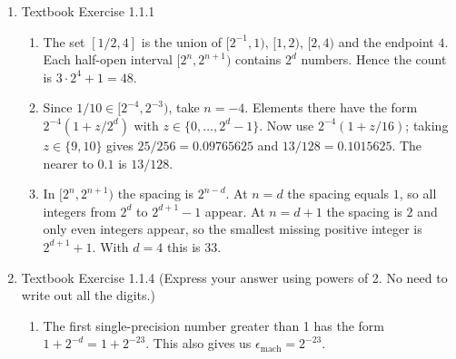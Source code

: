 \documentclass[reqno]{exam}
\begin{document}
\begin{enumerate}
\begin{solution}
\begin{enumerate}
  \item Computing $(a + b) - c$:
  \begin{align*}
    a &= 823.4 = 8.234 \times 10^{2} \quad \text{truncated:} \quad 8.234 \times 10^{2} \\
    b &= 723.45234 = 7.2345234 \times 10^{2} \quad \text{truncated:} \quad 7.234 \times 10^{2} \\
    a + b &= 8.234 \times 10^{2} + 7.234 \times 10^{2} = 1546.8 = 1.5468 \times 10^3 \\
    \text{truncated:} & \quad 1.546 \times 10^3 \\
    (a + b) - c &= 1.546 \times 10^{3} - 7.234 \times 10^{2} = 822.6 = 8.226 \times 10^{2} \\
    \text{truncated:} & \quad \boxed{8.226 \times 10^{2}}
  \end{align*}

\end{enumerate}
\end{solution}


\item Textbook Exercise 1.1.1

\begin{solution}
  \begin{enumerate}
    \item The set $[1/2,4]$ is the union of $[2^{-1},1)$, $[1,2)$, $[2,4)$ and the endpoint $4$. Each half-open interval $[2^n,2^{n+1})$ contains $2^d$ numbers. Hence the count is $3\cdot 2^4 + 1 = 48$.
    \item Since $1/10 \in [2^{-4},2^{-3})$, take $n=-4$. Elements there have the form $2^{-4}(1+z/2^d)$ with $z\in\{0,\dots,2^d-1\}$. Now use $2^{-4}(1+z/16)$; taking $z\in\{9,10\}$ gives $25/256=0.09765625$ and $13/128=0.1015625$. The nearer to $0.1$ is $13/128$.
    \item In $[2^n,2^{n+1})$ the spacing is $2^{n-d}$. At $n=d$ the spacing equals $1$, so all integers from $2^d$ to $2^{d+1}-1$ appear. At $n=d+1$ the spacing is $2$ and only even integers appear, so the smallest missing positive integer is $2^{d+1}+1$. With $d=4$ this is $33$.
\end{enumerate}

\end{solution}

\item Textbook Exercise 1.1.4 (Express your answer using powers of 2. No need to write out all the digits.)
\begin{solution}
\begin{enumerate}
  \item The first single-precision number greater than 1 has the form $1 + 2^{-d} = 1 + 2^{-23}$. This also gives us $\epsilon_{\text{mach}} = 2^{-23}$.
  

\end{enumerate}
\end{solution}
\end{enumerate}
\end{document}
